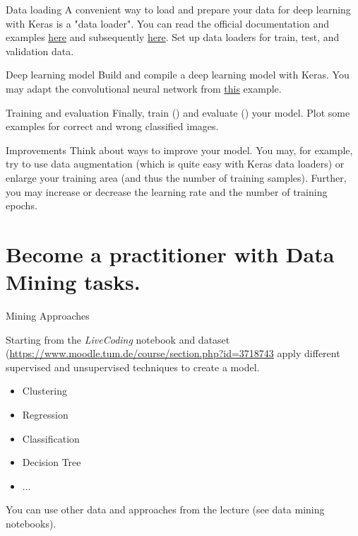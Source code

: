 \documentclass[twoside]{article}
\begin{document}
\begin{task}{Data loading}{}{}
A convenient way to load and prepare your data for deep learning with Keras is a "data loader".
You can read the official documentation and examples \href{https://keras.io/api/data_loading/}{here} and subsequently \href{https://keras.io/api/data_loading/image/}{here}.
Set up data loaders for train, test, and validation data.
\end{task}

\begin{task}{Deep learning model}{}{}
Build and compile a deep learning model with Keras.
You may adapt the convolutional neural network from \href{https://keras.io/examples/vision/mnist_convnet/}{this} example.
\end{task}

\begin{task}{Training and evaluation}{}{}
Finally, train () and evaluate () your model.
Plot some examples for correct and wrong classified images.
\end{task}


\begin{task}{Improvements}{}{}
Think about ways to improve your model.
You may, for example, try to use data augmentation (which is quite easy with Keras data loaders) or enlarge your training area (and thus the number of training samples).
Further, you may increase or decrease the learning rate and the number of training epochs.

\end{task}

\clearpage
\section{Become a practitioner with Data Mining tasks.}

\begin{task}{Mining Approaches}{}{}

Starting from the \textit{LiveCoding} notebook and dataset (\url{https://www.moodle.tum.de/course/section.php?id=3718743} apply different supervised and unsupervised techniques to create a model.

\begin{itemize}
    \item Clustering
    \item Regression
    \item Classification
    \item Decision Tree
    \item ...
\end{itemize}
\vspace{10pt}


You can use other data and approaches from the lecture (see data mining notebooks).


\end{task}
\end{document}

